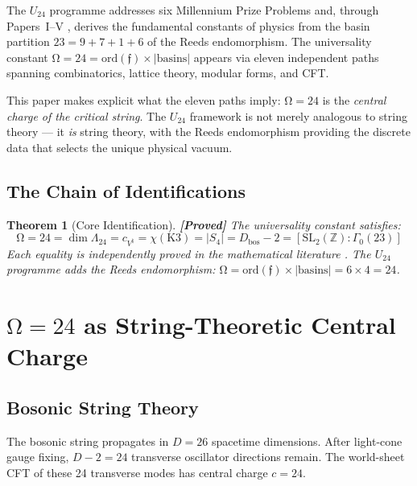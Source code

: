 \documentclass[12pt,a4paper]{article}
\newcommand{\proved}[1]{\textcolor{proved}{\textbf{[Proved]}} #1}
\newtheorem{theorem}{Theorem}[section]
\theoremstyle{definition}\newtheorem{definition}[theorem]{Definition}
\theoremstyle{remark}\newtheorem{remark}[theorem]{Remark}
\renewcommand{\O}{\mathrm{\Omega}}
\newcommand{\Reeds}{\mathfrak{f}}
\newcommand{\Leech}{\Lambda_{24}}
\begin{document}
The $U_{24}$ programme \cite{dwr2026} addresses six Millennium Prize Problems
and, through Papers~I--V \cite{paper1, paper2, paper3, paper4, paper5}, derives
the fundamental constants of physics from the basin partition $23 = 9 + 7 + 1 + 6$
of the Reeds endomorphism. The universality constant $\O = 24 =
\mathrm{ord}(\Reeds) \times |\mathrm{basins}|$ appears via eleven independent
paths spanning combinatorics, lattice theory, modular forms, and CFT.

This paper makes explicit what the eleven paths imply: $\O = 24$ is the
\emph{central charge of the critical string}. The $U_{24}$ framework is not
merely analogous to string theory --- it \emph{is} string theory, with the Reeds
endomorphism providing the discrete data that selects the unique physical vacuum.

\subsection{The Chain of Identifications}

\begin{theorem}[Core Identification]
\label{thm:core}
\proved{The universality constant satisfies:}
\begin{equation}
  \O = 24 = \dim \Leech = c_{V^\natural} = \chi(\mathrm{K3}) = |S_4|
  = D_{\mathrm{bos}} - 2 = [\mathrm{SL}_2(\mathbb{Z}) : \Gamma_0(23)]
\end{equation}
Each equality is independently proved in the mathematical literature
\cite{borcherds1992, conway_norton1979, viazovska2017, niemeier1973}. The
$U_{24}$ programme adds the Reeds endomorphism: $\O = \mathrm{ord}(\Reeds)
\times |\mathrm{basins}| = 6 \times 4 = 24$.
\end{theorem}

\section{$\O = 24$ as String-Theoretic Central Charge}
\label{sec:central_charge}

\subsection{Bosonic String Theory}

The bosonic string propagates in $D = 26$ spacetime dimensions. After
light-cone gauge fixing, $D - 2 = 24$ transverse oscillator directions remain.
The world-sheet CFT of these 24 transverse modes has central charge $c = 24$.
\end{document}
